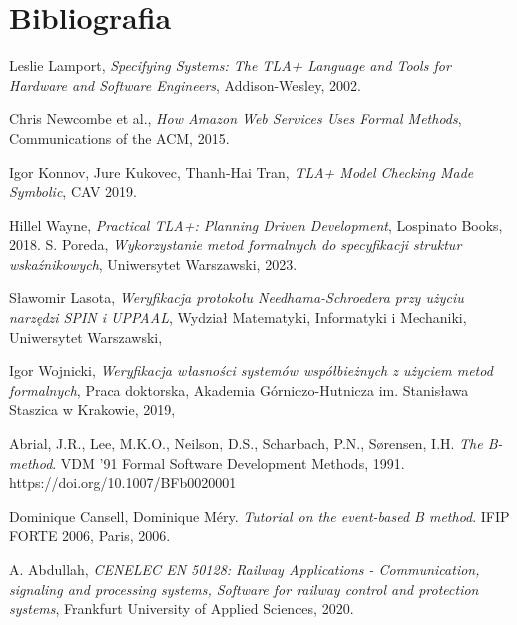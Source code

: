 \documentclass[conference]{IEEEtran}
\begin{document}
    \section{Bibliografia}
        \begin{thebibliography}{00}
            Leslie Lamport, \emph{Specifying Systems: The TLA+ Language and Tools for Hardware and Software Engineers}, Addison-Wesley, 2002.
          
            Chris Newcombe et al., \emph{How Amazon Web Services Uses Formal Methods}, Communications of the ACM, 2015.
          
            Igor Konnov, Jure Kukovec, Thanh-Hai Tran, \emph{TLA+ Model Checking Made Symbolic}, CAV 2019.
          
            Hillel Wayne, \emph{Practical TLA+: Planning Driven Development}, Lospinato Books, 2018.
            S. Poreda,
            \textit{Wykorzystanie metod formalnych do specyfikacji struktur wskaźnikowych},
            Uniwersytet Warszawski, 2023.
        
            Sławomir Lasota,
            \textit{Weryfikacja protokołu Needhama-Schroedera przy użyciu narzędzi SPIN i UPPAAL},
            Wydział Matematyki, Informatyki i Mechaniki, Uniwersytet Warszawski,
        
            Igor Wojnicki,
            \textit{Weryfikacja własności systemów współbieżnych z użyciem metod formalnych},
            Praca doktorska, Akademia Górniczo-Hutnicza im. Stanisława Staszica w Krakowie, 2019,
            
    Abrial, J.R., Lee, M.K.O., Neilson, D.S., Scharbach, P.N., Sørensen, I.H. \emph{The B-method}. VDM '91 Formal Software Development Methods, 1991. https://doi.org/10.1007/BFb0020001

    Dominique Cansell, Dominique Méry. \emph{Tutorial on the event-based B method}. IFIP FORTE 2006, Paris, 2006.

    A. Abdullah, \emph{CENELEC EN 50128: Railway Applications - Communication, signaling and processing systems, Software for railway control and protection systems}, Frankfurt University of Applied Sciences, 2020.


\end{thebibliography}
\end{document}
